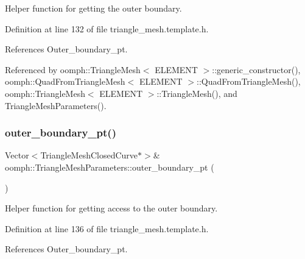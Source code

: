Helper function for getting the outer boundary. 



Definition at line 132 of file triangle\+\_\+mesh.\+template.\+h.



References Outer\+\_\+boundary\+\_\+pt.



Referenced by oomph\+::\+Triangle\+Mesh$<$ E\+L\+E\+M\+E\+N\+T $>$\+::generic\+\_\+constructor(), oomph\+::\+Quad\+From\+Triangle\+Mesh$<$ E\+L\+E\+M\+E\+N\+T $>$\+::\+Quad\+From\+Triangle\+Mesh(), oomph\+::\+Triangle\+Mesh$<$ E\+L\+E\+M\+E\+N\+T $>$\+::\+Triangle\+Mesh(), and Triangle\+Mesh\+Parameters().

\mbox{\label{classoomph_1_1TriangleMeshParameters_aa1b1acddc11df631c8fd692866a59e12}} 
\subsubsection{\texorpdfstring{outer\+\_\+boundary\+\_\+pt()}{outer\_boundary\_pt()}\hspace{0.1cm}{\footnotesize\ttfamily [2/4]}}
{\footnotesize\ttfamily Vector$<$Triangle\+Mesh\+Closed\+Curve$\ast$$>$\& oomph\+::\+Triangle\+Mesh\+Parameters\+::outer\+\_\+boundary\+\_\+pt (\begin{DoxyParamCaption}{ }\end{DoxyParamCaption})\hspace{0.3cm}{\ttfamily [inline]}}



Helper function for getting access to the outer boundary. 



Definition at line 136 of file triangle\+\_\+mesh.\+template.\+h.



References Outer\+\_\+boundary\+\_\+pt.

\mbox{\label{classoomph_1_1TriangleMeshParameters_a1b2f09177982f5c2f5a96d3f532d6ee7}} 
